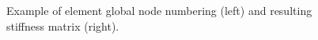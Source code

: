 \begin{figure}[h]
\begin{center}
	\end{center}
  \caption{
  Example of element global node numbering (left) and resulting stiffness matrix (right).
  }
	\label{fig:MatrixGraph}
\end{figure}

